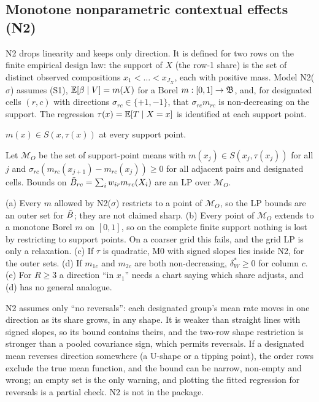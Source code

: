 \subsection{Monotone nonparametric contextual effects (N2)}\label{sec:N2}

N2 drops linearity and keeps only direction. It is defined for two rows on the
finite empirical design law: the support of $X$ (the row-1 share) is the set of
distinct observed compositions $x_1<\dots<x_{J_X}$, each with positive mass. Model
N2($\sigma$) assumes (S1), $\mathbb E[\beta\mid V]=m(X)$ for a Borel
$m:[0,1]\to\mathfrak B$, and, for designated cells $(r,c)$ with directions
$\sigma_{rc}\in\{+1,-1\}$, that $\sigma_{rc}m_{rc}$ is non-decreasing on the
support. The regression $\tau(x)=\mathbb E[T\mid X=x]$ is identified at each support
point.

\begin{lemma}\label{lem:N21}
$m(x)\in S(x,\tau(x))$ at every support point.
\end{lemma}

Let $\mathcal M_O$ be the set of support-point means with $m(x_j)\in S(x_j,\tau(x_j))$
for all $j$ and
$\sigma_{rc}(m_{rc}(x_{j+1})-m_{rc}(x_j))\ge0$ for all adjacent pairs and designated
cells. Bounds on $\tilde B_{rc}=\sum_iw_{ir}m_{rc}(X_i)$ are an LP over $\mathcal M_O$.

\begin{proposition}\label{prop:N2}
(a) Every $m$ allowed by N2($\sigma$) restricts to a point of $\mathcal M_O$, so the
LP bounds are an outer set for $\tilde B$; they are not claimed sharp.
(b) Every point of $\mathcal M_O$ extends to a monotone Borel $m$ on $[0,1]$, so on
the complete finite support nothing is lost by restricting to support points. On a
coarser grid this fails, and the grid LP is only a relaxation.
(c) If $\tau$ is quadratic, M0 with signed slopes lies inside N2, for the outer sets.
(d) If $m_{1c}$ and $m_{2c}$ are both non-decreasing, $\delta^*_W\ge0$ for column $c$.
(e) For $R\ge3$ a direction ``in $x_1$'' needs a chart saying which share adjusts,
and (d) has no general analogue.
\end{proposition}
\begin{reading}
N2 assumes only ``no reversals'': each designated group's mean rate moves in one
direction as its share grows, in any shape. It is weaker than straight lines with
signed slopes, so its bound contains theirs, and the two-row shape restriction is
stronger than a pooled covariance sign, which permits reversals. If a designated
mean reverses direction somewhere (a U-shape or a tipping point), the order rows
exclude the true mean function, and the bound can be narrow, non-empty and wrong;
an empty set is the only warning, and plotting the fitted regression for
reversals is a partial check. N2 is not in the package.
\end{reading}

